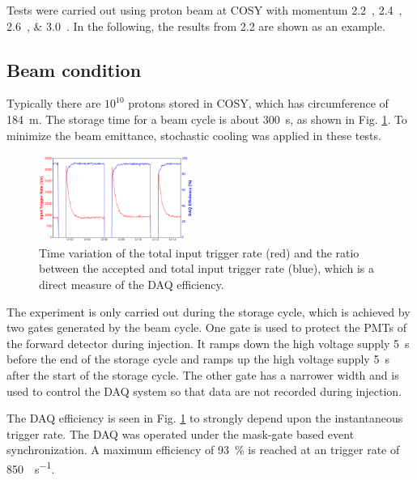 \documentclass[number,5p]{elsarticle}
\begin{document}
Tests were carried out using proton beam at COSY with momentum
\SIlist[list-units=single]{2.2;2.4;2.6;3.0}{\momentum}.
In the following, the results from \SI{2.2}{\momentum} are shown as an example.

\subsection{Beam condition}
\label{sec:beam}
Typically there are $10^{10}$ protons stored in COSY, which has circumference of
\SI{184}{\meter}.
The storage time for a beam cycle is about \SI{300}{\second}, as shown in Fig. \ref{fig:beam}.
To minimize the beam emittance, stochastic cooling \cite{cooling} was applied in these tests.
\begin{figure}[h]
  \centering
  \includegraphics[width=0.45\textwidth]{./daq_efficiency.png}
  \caption{Time variation of the total input trigger rate (red) and the ratio between the accepted and total input trigger rate (blue), which is a direct measure of the DAQ efficiency.}
  \label{fig:beam}
\end{figure}

The experiment is only carried out during the storage cycle, which is achieved by two
gates generated by the beam cycle.
One gate is used to protect the PMTs of the forward detector during injection.
It ramps down the high voltage supply \SI{5}{\second} before the end of the
storage cycle and ramps up the high voltage supply \SI{5}{\second} after the start of the storage cycle.
The other gate has a narrower width and is used to control the DAQ system so that data are not recorded during injection.

The DAQ efficiency is seen in Fig. \ref{fig:beam} to strongly depend upon the
instantaneous trigger rate.
The DAQ was operated under the mask-gate based event synchronization.
A maximum efficiency of \SI{93}{\percent} is reached at an trigger rate of \SI{850}{\event\per\second}.
\end{document}
